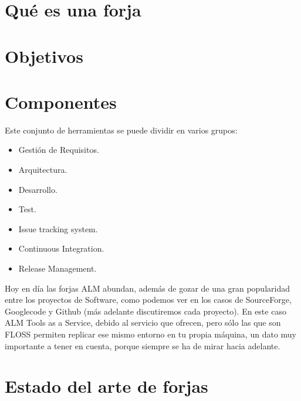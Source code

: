 

\section{Qué es una forja}
\label{sec:que-es}


\section{Objetivos}
\label{sec:objetivos}


\section{Componentes}
\label{sec:componentes}

\par Este conjunto de herramientas se puede dividir en varios grupos:

\begin{itemize}
	\item Gesti\'on de Requisitos.
	\item Arquitectura.
	\item Desarrollo.
	\item Test.
	\item Issue tracking system.
	\item Continuous Integration.
	\item Release Management.
\end{itemize}

\par Hoy en d\'ia las forjas ALM abundan, adem\'as de gozar de una gran popularidad entre los proyectos de Software, como podemos ver en los casos de SourceForge, Googlecode y Github (más adelante discutiremos cada proyecto). En este caso ALM Tools as a Service, debido al servicio que ofrecen, pero sólo las que son FLOSS permiten replicar ese mismo entorno en tu propia máquina, un dato muy importante a tener en cuenta, porque siempre se ha de mirar hacia adelante.


\section{Estado del arte de forjas}
\label{sec:estado-del-arte}

